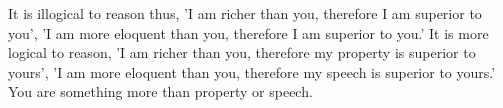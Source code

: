 It is illogical to reason thus, 'I  am richer than you, therefore I am superior
to you', 'I am  more eloquent than you, therefore I am superior  to you.' It is
more  logical to  reason,  'I am  richer  than you,  therefore  my property  is
superior  to yours',  'I am  more  eloquent than  you, therefore  my speech  is
superior to yours.' You are something more than property or speech.
